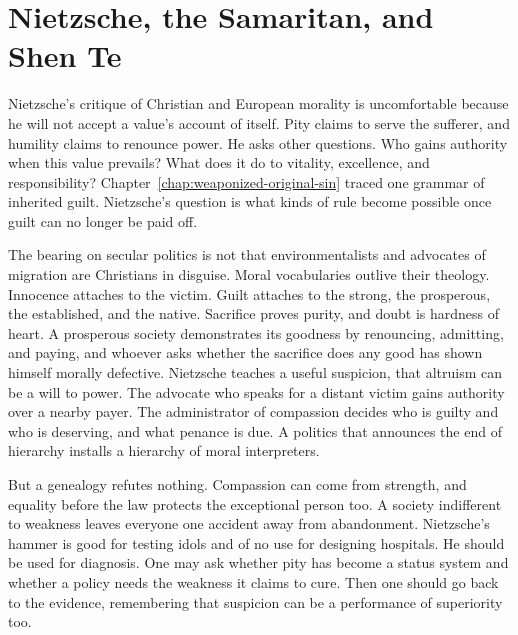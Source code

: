 \documentclass[12pt,a4paper]{book}
\begin{document}
\section{Nietzsche, the Samaritan, and Shen Te}

Nietzsche's critique of Christian and European morality is uncomfortable because he will not accept a value's account of itself. Pity claims to serve the sufferer, and humility claims to renounce power. He asks other questions. Who gains authority when this value prevails? What does it do to vitality, excellence, and responsibility? \cite{Nietzsche-GM,Nietzsche-JGB} Chapter~\ref{chap:weaponized-original-sin} traced one grammar of inherited guilt. Nietzsche's question is what kinds of rule become possible once guilt can no longer be paid off.

The bearing on secular politics is not that environmentalists and advocates of migration are Christians in disguise. Moral vocabularies outlive their theology. Innocence attaches to the victim. Guilt attaches to the strong, the prosperous, the established, and the native. Sacrifice proves purity, and doubt is hardness of heart. A prosperous society demonstrates its goodness by renouncing, admitting, and paying, and whoever asks whether the sacrifice does any good has shown himself morally defective. Nietzsche teaches a useful suspicion, that altruism can be a will to power. The advocate who speaks for a distant victim gains authority over a nearby payer. The administrator of compassion decides who is guilty and who is deserving, and what penance is due. A politics that announces the end of hierarchy installs a hierarchy of moral interpreters.

But a genealogy refutes nothing. Compassion can come from strength, and equality before the law protects the exceptional person too. A society indifferent to weakness leaves everyone one accident away from abandonment. Nietzsche's hammer is good for testing idols and of no use for designing hospitals. He should be used for diagnosis. One may ask whether pity has become a status system and whether a policy needs the weakness it claims to cure. Then one should go back to the evidence, remembering that suspicion can be a performance of superiority too.
\end{document}
